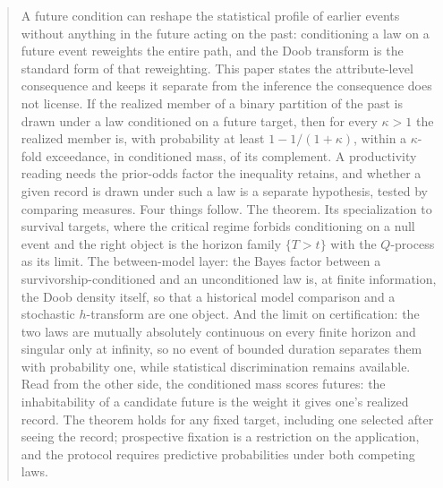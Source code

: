 \begin{abstract}
A future condition can reshape the statistical profile of earlier events without anything in the future acting on the past: conditioning a law on a future event reweights the entire path, and the Doob transform is the standard form of that reweighting. This paper states the attribute-level consequence and keeps it separate from the inference the consequence does not license. If the realized member of a binary partition of the past is drawn under a law conditioned on a future target, then for every $\kappa>1$ the realized member is, with probability at least $1-1/(1+\kappa)$, within a $\kappa$-fold exceedance, in conditioned mass, of its complement. A productivity reading needs the prior-odds factor the inequality retains, and whether a given record is drawn under such a law is a separate hypothesis, tested by comparing measures. Four things follow. The theorem. Its specialization to survival targets, where the critical regime forbids conditioning on a null event and the right object is the horizon family $\{T>t\}$ with the $Q$-process as its limit. The between-model layer: the Bayes factor between a survivorship-conditioned and an unconditioned law is, at finite information, the Doob density itself, so that a historical model comparison and a stochastic $h$-transform are one object. And the limit on certification: the two laws are mutually absolutely continuous on every finite horizon and singular only at infinity, so no event of bounded duration separates them with probability one, while statistical discrimination remains available. Read from the other side, the conditioned mass scores futures: the inhabitability of a candidate future is the weight it gives one's realized record. The theorem holds for any fixed target, including one selected after seeing the record; prospective fixation is a restriction on the application, and the protocol requires predictive probabilities under both competing laws.

\end{abstract}
